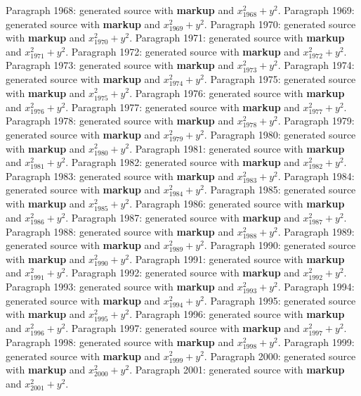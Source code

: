 \documentclass{article}
\begin{document}
Paragraph 1968: generated source with \textbf{markup} and $x_{1968}^2 + y^2$.
Paragraph 1969: generated source with \textbf{markup} and $x_{1969}^2 + y^2$.
Paragraph 1970: generated source with \textbf{markup} and $x_{1970}^2 + y^2$.
Paragraph 1971: generated source with \textbf{markup} and $x_{1971}^2 + y^2$.
Paragraph 1972: generated source with \textbf{markup} and $x_{1972}^2 + y^2$.
Paragraph 1973: generated source with \textbf{markup} and $x_{1973}^2 + y^2$.
Paragraph 1974: generated source with \textbf{markup} and $x_{1974}^2 + y^2$.
Paragraph 1975: generated source with \textbf{markup} and $x_{1975}^2 + y^2$.
Paragraph 1976: generated source with \textbf{markup} and $x_{1976}^2 + y^2$.
Paragraph 1977: generated source with \textbf{markup} and $x_{1977}^2 + y^2$.
Paragraph 1978: generated source with \textbf{markup} and $x_{1978}^2 + y^2$.
Paragraph 1979: generated source with \textbf{markup} and $x_{1979}^2 + y^2$.
Paragraph 1980: generated source with \textbf{markup} and $x_{1980}^2 + y^2$.
Paragraph 1981: generated source with \textbf{markup} and $x_{1981}^2 + y^2$.
Paragraph 1982: generated source with \textbf{markup} and $x_{1982}^2 + y^2$.
Paragraph 1983: generated source with \textbf{markup} and $x_{1983}^2 + y^2$.
Paragraph 1984: generated source with \textbf{markup} and $x_{1984}^2 + y^2$.
Paragraph 1985: generated source with \textbf{markup} and $x_{1985}^2 + y^2$.
Paragraph 1986: generated source with \textbf{markup} and $x_{1986}^2 + y^2$.
Paragraph 1987: generated source with \textbf{markup} and $x_{1987}^2 + y^2$.
Paragraph 1988: generated source with \textbf{markup} and $x_{1988}^2 + y^2$.
Paragraph 1989: generated source with \textbf{markup} and $x_{1989}^2 + y^2$.
Paragraph 1990: generated source with \textbf{markup} and $x_{1990}^2 + y^2$.
Paragraph 1991: generated source with \textbf{markup} and $x_{1991}^2 + y^2$.
Paragraph 1992: generated source with \textbf{markup} and $x_{1992}^2 + y^2$.
Paragraph 1993: generated source with \textbf{markup} and $x_{1993}^2 + y^2$.
Paragraph 1994: generated source with \textbf{markup} and $x_{1994}^2 + y^2$.
Paragraph 1995: generated source with \textbf{markup} and $x_{1995}^2 + y^2$.
Paragraph 1996: generated source with \textbf{markup} and $x_{1996}^2 + y^2$.
Paragraph 1997: generated source with \textbf{markup} and $x_{1997}^2 + y^2$.
Paragraph 1998: generated source with \textbf{markup} and $x_{1998}^2 + y^2$.
Paragraph 1999: generated source with \textbf{markup} and $x_{1999}^2 + y^2$.
Paragraph 2000: generated source with \textbf{markup} and $x_{2000}^2 + y^2$.
Paragraph 2001: generated source with \textbf{markup} and $x_{2001}^2 + y^2$.
\end{document}
